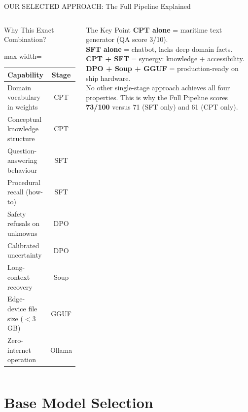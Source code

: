 \documentclass[aspectratio=169,11pt]{beamer}
\begin{document}
\begin{frame}[shrink=22]{OUR SELECTED APPROACH: The Full Pipeline Explained}
\begin{columns}[T]

\begin{block}{Why This Exact Combination?}
  \scriptsize
  \begin{adjustbox}{max width=\linewidth}
  \begin{tabular}{@{}lc@{}}
    \toprule
    \textbf{Capability} & \textbf{Stage}\\
    \midrule
    Domain vocabulary in weights & CPT\\
    Conceptual knowledge structure & CPT\\
    Question-answering behaviour & SFT\\
    Procedural recall (how-to) & SFT\\
    Safety refusals on unknowns & DPO\\
    Calibrated uncertainty & DPO\\
    Long-context recovery & Soup\\
    Edge-device file size ($<$3\,GB) & GGUF\\
    Zero-internet operation & Ollama\\
    \bottomrule
  \end{tabular}
  \end{adjustbox}
\end{block}

\vspace{5pt}
\begin{block}{The Key Point}
  \scriptsize\RaggedRight
  \textbf{CPT alone} = maritime text generator (QA score 3/10).\\
  \textbf{SFT alone} = chatbot, lacks deep domain facts.\\
  \textbf{CPT + SFT} = synergy: knowledge + accessibility.\\
  \textbf{DPO + Soup + GGUF} = production-ready on ship hardware.\\[3pt]
  No other single-stage approach achieves all four properties.
  This is why the Full Pipeline scores \textbf{73/100}
  versus 71 (SFT only) and 61 (CPT only).
\end{block}

\end{columns}
\end{frame}

\section{Base Model Selection}
\end{document}
